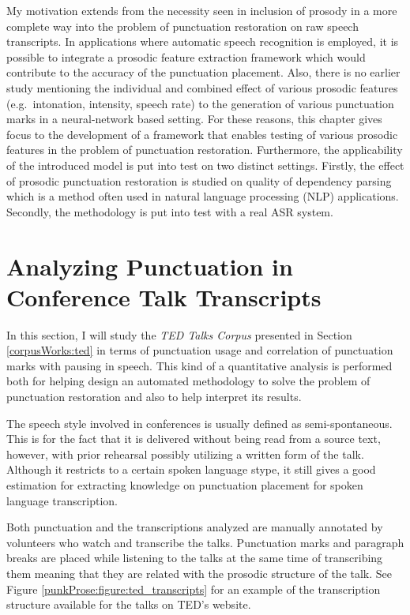 My motivation extends from the necessity seen in inclusion of prosody in a more complete way into the problem of punctuation restoration on raw speech transcripts. In applications where automatic speech recognition is employed, it is possible to integrate a prosodic feature extraction framework which would contribute to the accuracy of the punctuation placement. Also, there is no earlier study mentioning the individual and combined effect of various prosodic features (e.g.~intonation, intensity, speech rate) to the generation of various punctuation marks in a neural-network based setting. For these reasons, this chapter gives focus to the development of a framework that enables testing of various prosodic features in the problem of punctuation restoration. Furthermore, the applicability of the introduced model is put into test on two distinct settings. Firstly, the effect of prosodic punctuation restoration is studied on quality of dependency parsing which is a method often used in natural language processing (NLP) applications. Secondly, the methodology is put into test with a real ASR system. 

\section{Analyzing Punctuation in Conference Talk Transcripts}
\label{punkProse:analysis}
In this section, I will study the \textit{TED Talks Corpus} presented in Section \ref{corpusWorks:ted} in terms of punctuation usage and correlation of punctuation marks with pausing in speech. This kind of a quantitative analysis is performed both for helping design an automated methodology to solve the problem of punctuation restoration and also to help interpret its results. 

The speech style involved in conferences is usually defined as semi-spontaneous. This is for the fact that it is delivered without being read from a source text, however, with prior rehearsal possibly utilizing a written form of the talk. Although it restricts to a certain spoken language stype, it still gives a good estimation for extracting knowledge on punctuation placement for spoken language transcription. 

Both punctuation and the transcriptions analyzed are manually annotated by volunteers who watch and transcribe the talks. Punctuation marks and paragraph breaks are placed while listening to the talks at the same time of transcribing them meaning that they are related with the prosodic structure of the talk. See Figure \ref{punkProse:figure:ted_transcripts} for an example of the transcription structure available for the talks on TED's website. 

